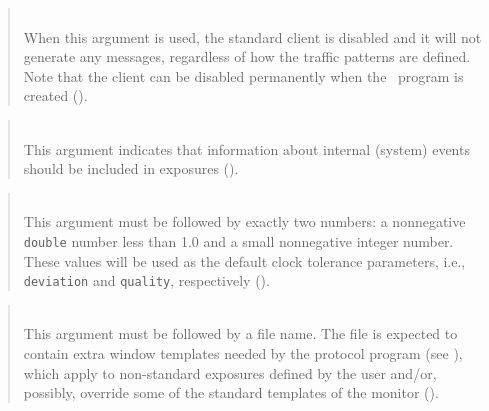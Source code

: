 \begin{quote}
\noindent{}\\ \hspace{0in}
When this argument is used, the standard client is disabled and it will
not generate any messages, regardless of how the traffic patterns are defined.
Note that the client can be disabled permanently when the \smurph\ program is
created ().
\end{quote}

\begin{quote}
\noindent{}\\ \hspace{0in}
This argument indicates that information about internal (system) events
should be included in exposures ().
\end{quote}

\begin{quote}
\noindent{}\\ \hspace{0in}
This argument must be followed by exactly two numbers: a nonnegative
{\tt double} number less than 1.0 and a small nonnegative integer
number.
These values will be used as the default clock tolerance parameters, i.e.,
{\tt deviation} and {\tt quality}, respectively ().
\end{quote}

\begin{quote}
\noindent{}\\ \hspace{0in}
This argument must be followed by a file name.
The file is expected to contain extra window templates needed by the
protocol program (see ),
which apply to non-standard exposures defined by
the user and/or, possibly, override some of the standard templates of
the monitor ().
\end{quote}

